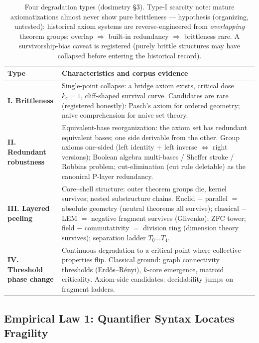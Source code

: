 \begin{table}[h]
\centering
\begin{tabular}{lp{}}
\toprule
\textbf{Type} & \textbf{Characteristics and corpus evidence} \\
\midrule
\textbf{I. Brittleness} & Single-point collapse: a bridge axiom exists,
critical dose $k_c=1$, cliff-shaped survival curve. Candidates are
rare (registered honestly): Pasch's axiom for ordered geometry; naive
comprehension for naive set theory. \\
\textbf{II. Redundant robustness} & Equivalent-base reorganization:
the axiom set has redundant equivalent bases; one side derivable from
the other. Group axioms one-sided (left identity + left inverse
$\Leftrightarrow$ right versions); Boolean algebra multi-bases /
Sheffer stroke / Robbins problem; cut-elimination (cut rule
deletable) as the canonical P-layer redundancy. \\
\textbf{III. Layered peeling} & Core--shell structure: outer theorem
groups die, kernel survives; nested substructure chains. Euclid
$-$ parallel $=$ absolute geometry (neutral theorems all survive);
classical $-$ LEM $=$ negative fragment survives (Glivenko); ZFC
tower; field $-$ commutativity $=$ division ring (dimension theory
survives); separation ladder $T_0\ldots T_4$. \\
\textbf{IV. Threshold phase change} & Continuous degradation to a
critical point where collective properties flip. Classical ground:
graph connectivity thresholds (Erd\H{o}s--R\'enyi), $k$-core
emergence, matroid criticality. Axiom-side candidates: decidability
jumps on fragment ladders. \\
\bottomrule
\end{tabular}
\caption{Four degradation types (dosimetry \S3). Type-I scarcity note:
mature axiomatizations almost never show pure brittleness ---
hypothesis (organizing, untested): historical axiom systems are
reverse-engineered from \emph{overlapping} theorem groups; overlap
$\Rightarrow$ built-in redundancy $\Rightarrow$ brittleness rare. A
survivorship-bias caveat is registered (purely brittle structures may
have collapsed before entering the historical record).}
\end{table}

\subsection{Empirical Law 1: Quantifier Syntax Locates Fragility}\label{sec:act1-law1}

